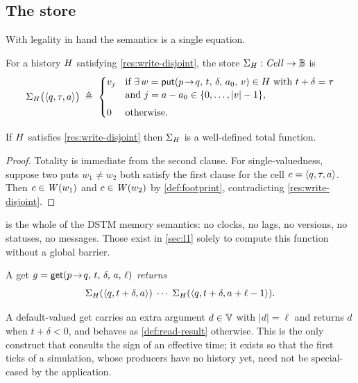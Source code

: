 \subsection{The store}
\label{sec:l0-store}

With legality in hand the semantics is a single equation.

\begin{definition}\label{def:store-h}
For a history $H$ satisfying \cref{res:write-disjoint}, the store
$\Sigma_{H} : \mathit{Cell} \to \mathbb{B}$ is
\[
  \Sigma_{H}\bigl(\langle q, \tau, a\rangle\bigr) \;\triangleq\;
  \begin{cases}
    v_j
      & \text{if } \exists\, w = \mathsf{put}(p\!\to\!q,\,t,\,\delta,\,a_0,\,v) \in H
        \text{ with } t + \delta = \tau \\[-1pt]
      & \text{and } j = a - a_0 \in \{0, \dots, |v| - 1\}, \\[4pt]
    0 & \text{otherwise.}
  \end{cases}
\]
\end{definition}

\begin{lemma}\label{lem:store-welldef}
If $H$ satisfies \cref{res:write-disjoint} then $\Sigma_{H}$ is a
well-defined total function.
\end{lemma}

\begin{proof}
Totality is immediate from the second clause. For single-valuedness, suppose
two puts $w_1 \ne w_2$ both satisfy the first clause for the cell
$c = \langle q, \tau, a\rangle$. Then $c \in \mathit{W}(w_1)$ and $c \in \mathit{W}(w_2)$ by
\cref{def:footprint}, contradicting \cref{res:write-disjoint}.
\end{proof}

 is the whole of the DSTM memory semantics: no clocks, no
lags, no \glspl{version}, no statuses, no messages. Those exist in
\cref{sec:l1} solely to compute this function without a global \gls{barrier}.

\begin{definition}\label{def:read-result}
A get $g = \mathsf{get}(p\!\to\!q,\,t,\,\delta,\,a,\,\ell)$ \emph{returns}
\[
  \Sigma_{H}(\langle q, t+\delta, a\rangle)
  \;\cdots\;
  \Sigma_{H}(\langle q, t+\delta, a+\ell-1\rangle).
\]
\end{definition}

\begin{definition}\label{def:get-or-default}
A default-valued get carries an extra argument $d \in \mathbb{V}$ with $|d| =
\ell$ and returns $d$ when $t + \delta < 0$, and behaves as
\cref{def:read-result} otherwise. This is the only construct that consults the
sign of an effective time; it exists so that the first ticks of a simulation,
whose producers have no history yet, need not be special-cased by the
application.
\end{definition}

